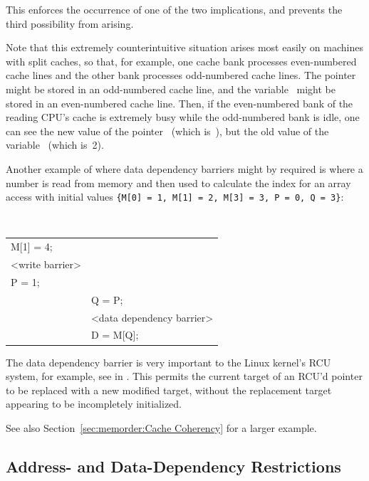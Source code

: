 This enforces the occurrence of one of the two implications, and prevents the
third possibility from arising.

Note that this extremely counterintuitive situation arises most easily on
machines with split caches, so that, for example, one cache bank processes
even-numbered cache lines and the other bank processes odd-numbered cache
lines.
The pointer~ might be stored in an odd-numbered cache line, and the
variable~ might be stored in an even-numbered cache line.  Then, if the
even-numbered bank of the reading CPU's cache is extremely busy while the
odd-numbered bank is idle, one can see the new value of the
pointer~ (which is~),
but the old value of the variable~ (which is~2).

Another example of where data dependency barriers might by required is where a
number is read from memory and then used to calculate the index for an array
access with initial values
{\tt \{M[0]~=~1, M[1]~=~2, M[3]~=~3, P~=~0, Q~=~3\}}:

\vspace{5pt}
\begin{minipage}[t]{\columnwidth}
\tt
\scriptsize
\begin{tabular}{l|p{1.5in}}
	\nf{CPU 1} &	\nf{CPU 2} \\
	\hline
	M[1] = 4; & \\
	<write barrier> & \\
	P = 1;	&	\\
		&	Q = P; \\
		&	<data dependency barrier> \\
		&	D = M[Q]; \\
\end{tabular}
\end{minipage}
\vspace{5pt}

The data dependency barrier is very important to the Linux kernel's
RCU system, for example,
see  in .
This permits the current
target of an RCU'd pointer to be replaced with a new modified target, without
the replacement target appearing to be incompletely initialized.

See also
Section~\ref{sec:memorder:Cache Coherency}
for a larger example.


\subsection{Address- and Data-Dependency Restrictions}
\label{sec:memorder:Address- and Data-Dependency Restrictions}

